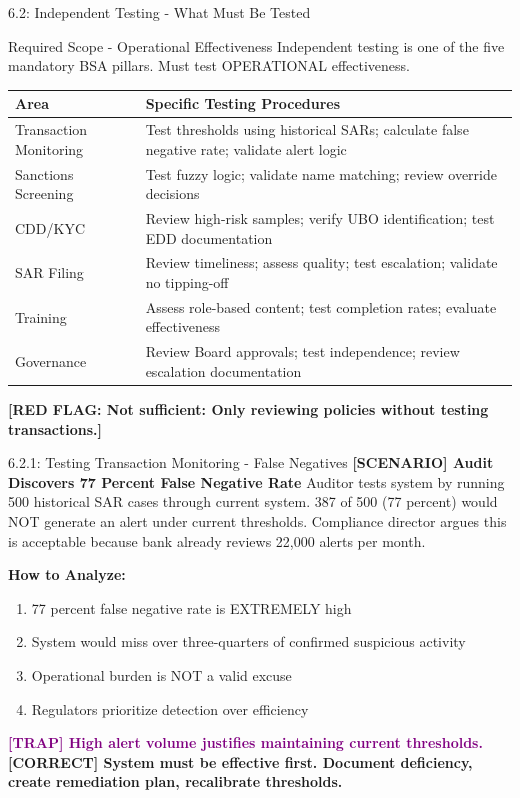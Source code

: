 \documentclass[11pt,a4paper]{beamer}
\newcommand{\trap}[1]{\textcolor{purple}{\textbf{[TRAP] #1}}}
\newcommand{\correct}[1]{\textcolor{green!50!black}{\textbf{[CORRECT] #1}}}
\newcommand{\scenario}[1]{\textcolor{blue!70!black}{\textbf{[SCENARIO] #1}}}
\newcommand{\redflag}[1]{\textcolor{red!80!black}{\textbf{[RED FLAG: #1]}}}
\begin{document}
\begin{frame}{6.2: Independent Testing - What Must Be Tested}
	\begin{block}{Required Scope - Operational Effectiveness}
		Independent testing is one of the five mandatory BSA pillars. Must test OPERATIONAL effectiveness.
	\end{block}
	\begin{tabular}{p{}|p{}}
		\hline
		\rowcolor{lightgray}
		\textbf{Area} & \textbf{Specific Testing Procedures} \\
		\hline
		Transaction Monitoring & Test thresholds using historical SARs; calculate false negative rate; validate alert logic \\
		\hline
		Sanctions Screening & Test fuzzy logic; validate name matching; review override decisions \\
		\hline
		CDD/KYC & Review high-risk samples; verify UBO identification; test EDD documentation \\
		\hline
		SAR Filing & Review timeliness; assess quality; test escalation; validate no tipping-off \\
		\hline
		Training & Assess role-based content; test completion rates; evaluate effectiveness \\
		\hline
		Governance & Review Board approvals; test independence; review escalation documentation \\
		\hline
	\end{tabular}
	\redflag{Not sufficient: Only reviewing policies without testing transactions.}
\end{frame}

\begin{frame}{6.2.1: Testing Transaction Monitoring - False Negatives}
	\scenario{Audit Discovers 77 Percent False Negative Rate}
	Auditor tests system by running 500 historical SAR cases through current system. 387 of 500 (77 percent) would NOT generate an alert under current thresholds. Compliance director argues this is acceptable because bank already reviews 22,000 alerts per month.
	
	\vspace{0.1cm}
	\textbf{How to Analyze:}
	\begin{enumerate}
		\item 77 percent false negative rate is EXTREMELY high
		\item System would miss over three-quarters of confirmed suspicious activity
		\item Operational burden is NOT a valid excuse
		\item Regulators prioritize detection over efficiency
	\end{enumerate}
	\trap{High alert volume justifies maintaining current thresholds.}
	\correct{System must be effective first. Document deficiency, create remediation plan, recalibrate thresholds.}
\end{frame}
\end{document}
